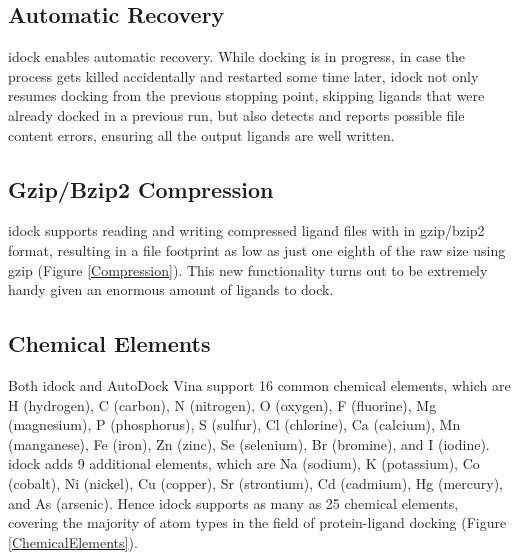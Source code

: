 \documentclass[12pt]{article}
\begin{document}

\subsection*{\sffamily \large Automatic Recovery}

idock enables automatic recovery. While docking is in progress, in case the process gets killed accidentally and restarted some time later, idock not only resumes docking from the previous stopping point, skipping ligands that were already docked in a previous run, but also detects and reports possible file content errors, ensuring all the output ligands are well written.

\subsection*{\sffamily \large Gzip/Bzip2 Compression}

idock supports reading and writing compressed ligand files with in gzip/bzip2 format, resulting in a file footprint as low as just one eighth of the raw size using gzip (Figure \ref{Compression}). This new functionality turns out to be extremely handy given an enormous amount of ligands to dock.

\subsection*{\sffamily \large Chemical Elements}

Both idock and AutoDock Vina support 16 common chemical elements, which are H (hydrogen), C (carbon), N (nitrogen), O (oxygen), F (fluorine), Mg (magnesium), P (phosphorus), S (sulfur), Cl (chlorine), Ca (calcium), Mn (manganese), Fe (iron), Zn (zinc), Se (selenium), Br (bromine), and I (iodine). idock adds 9 additional elements, which are Na (sodium), K (potassium), Co (cobalt), Ni (nickel), Cu (copper), Sr (strontium), Cd (cadmium), Hg (mercury), and As (arsenic). Hence idock supports as many as 25 chemical elements, covering the majority of atom types in the field of protein-ligand docking (Figure \ref{ChemicalElements}).
\end{document}
